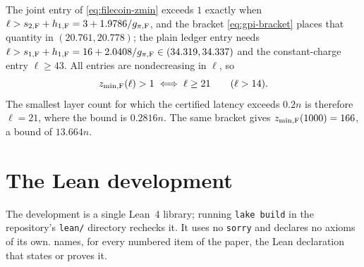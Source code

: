 \documentclass[11pt]{article}
\theoremstyle{plain}
\theoremstyle{remark}
\begin{document}
The joint entry of \eqref{eq:filecoin-zmin} exceeds \(1\) exactly when
\(\ell>s_{2,{\rm F}}+h_{1,{\rm F}}=3+1.9786/g_{\pi,{\rm F}}\),
and the bracket \eqref{eq:gpi-bracket} places that quantity in \((20.761,20.778)\); the
plain ledger entry needs
\(\ell>s_{1,{\rm F}}+h_{1,{\rm F}}=16+2.0408/g_{\pi,{\rm F}}\in(34.319,34.337)\) and the
constant-charge entry \(\ell\ge43\).  All entries are nondecreasing in \(\ell\), so
\begin{equation}
 z_{\min,{\rm F}}(\ell)>1\iff \ell\ge21
 \qquad(\ell>14).
 \label{eq:filecoin-threshold}
\end{equation}
The smallest layer count for which the certified latency exceeds \(0.2n\) is therefore
\(\ell=21\), where the bound is \(0.2816n\).  The same bracket gives
\(z_{\min,{\rm F}}(1000)=166\), a bound of \(13.664n\).

\section{The Lean development}
\label{app:lean}
The development is a single Lean~4 library; running \texttt{lake build} in the
repository's \texttt{lean/} directory rechecks it.  It uses no \texttt{sorry} and
declares no axioms of its own.
 names, for every numbered item of the paper, the Lean declaration that
states or proves it.
\end{document}
